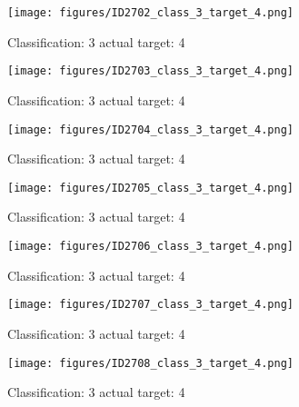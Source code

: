 \begin{figure}[h!]
\begin{center}
\texttt{[image: figures/ID2702\_class\_3\_target\_4.png]}
\end{center}
\caption{ Classification: 3 actual target: 4}
\label{fig:ID2702_class_3_target_4}
\end{figure}
\begin{figure}[h!]
\begin{center}
\texttt{[image: figures/ID2703\_class\_3\_target\_4.png]}
\end{center}
\caption{ Classification: 3 actual target: 4}
\label{fig:ID2703_class_3_target_4}
\end{figure}
\begin{figure}[h!]
\begin{center}
\texttt{[image: figures/ID2704\_class\_3\_target\_4.png]}
\end{center}
\caption{ Classification: 3 actual target: 4}
\label{fig:ID2704_class_3_target_4}
\end{figure}
\begin{figure}[h!]
\begin{center}
\texttt{[image: figures/ID2705\_class\_3\_target\_4.png]}
\end{center}
\caption{ Classification: 3 actual target: 4}
\label{fig:ID2705_class_3_target_4}
\end{figure}
\begin{figure}[h!]
\begin{center}
\texttt{[image: figures/ID2706\_class\_3\_target\_4.png]}
\end{center}
\caption{ Classification: 3 actual target: 4}
\label{fig:ID2706_class_3_target_4}
\end{figure}
\begin{figure}[h!]
\begin{center}
\texttt{[image: figures/ID2707\_class\_3\_target\_4.png]}
\end{center}
\caption{ Classification: 3 actual target: 4}
\label{fig:ID2707_class_3_target_4}
\end{figure}
\begin{figure}[h!]
\begin{center}
\texttt{[image: figures/ID2708\_class\_3\_target\_4.png]}
\end{center}
\caption{ Classification: 3 actual target: 4}
\label{fig:ID2708_class_3_target_4}
\end{figure}
